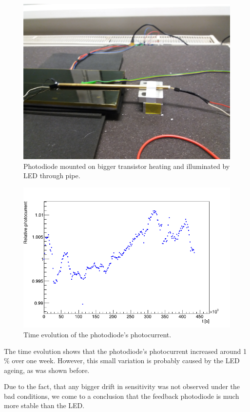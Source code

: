 \begin{figure}[H]
 \centering
 \includegraphics[scale=0.08, angle=180]{./pictures/TempDestrc}
 \caption{Photodiode mounted on bigger transistor heating and illuminated by LED through pipe.}
 \label{aging}
\end{figure}


\begin{figure}[H]
 \centering
 \includegraphics[scale=0.6]{./pictures/ArtiAging}
 \caption{Time evolution of the photodiode's photocurrent.}
 \label{agingPhotoCurrent}
\end{figure}

The time evolution shows that the photodiode's photocurrent increased around 1 $\%$ over one week. However, this small variation is probably caused by the LED ageing, as was shown before. 
\par
Due to the fact, that any bigger drift in sensitivity was not observed under the bad conditions, we come to a conclusion that the feedback photodiode is much more stable than the LED.


